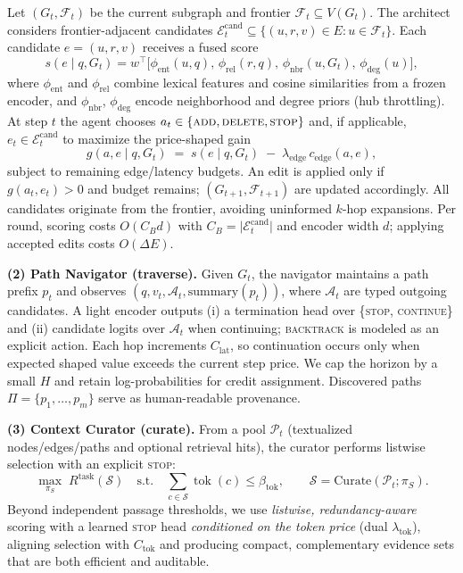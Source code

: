 \documentclass{article} %
\begin{document}
Let \((G_t,\mathcal{F}_t)\) be the current subgraph and frontier \(\mathcal{F}_t \subseteq V(G_t)\).
The architect considers frontier-adjacent candidates
$
\mathcal{E}^{\text{cand}}_t \subseteq \{(u,r,v)\in E : u\in \mathcal{F}_t\}.
$
Each candidate \(e=(u,r,v)\) receives a fused score
\[
s(e \mid q,G_t)=
w^\top\!\Big[
\phi_{\text{ent}}(u,q),\,
\phi_{\text{rel}}(r,q),\,
\phi_{\text{nbr}}(u,G_t),\,
\phi_{\text{deg}}(u)
\Big],
\]
where \(\phi_{\text{ent}}\) and \(\phi_{\text{rel}}\) combine lexical features and cosine similarities from a frozen encoder, and
\(\phi_{\text{nbr}}\), \(\phi_{\text{deg}}\) encode neighborhood and degree priors (hub throttling).
At step \(t\) the agent chooses \(a_t \in \{\textsc{add},\textsc{delete},\textsc{stop}\}\) and, if applicable, \(e_t \in \mathcal{E}^{\text{cand}}_t\) to maximize the price-shaped gain
\[
g(a,e \mid q,G_t) \;=\; s(e \mid q,G_t)\;-\;\lambda_{\text{edge}}\,c_{\text{edge}}(a,e),
\]
subject to remaining edge/latency budgets.
An edit is applied only if \(g(a_t,e_t)>0\) and budget remains; \((G_{t+1},\mathcal{F}_{t+1})\) are updated accordingly.
All candidates originate from the frontier, avoiding uninformed \(k\)-hop expansions.
Per round, scoring costs \(O(C_B d)\) with \(C_B=\lvert \mathcal{E}^{\text{cand}}_t\rvert\) and encoder width \(d\); applying accepted edits costs \(O(\Delta E)\).



\textbf{(2) Path Navigator (traverse).}
Given $G_t$, the navigator maintains a path prefix $p_t$ and observes $(q, v_t, \mathcal{A}_t, \mathrm{summary}(p_t))$, where $\mathcal{A}_t$ are typed outgoing candidates. A light encoder outputs (i) a termination head over \{\textsc{stop}, \textsc{continue}\} and (ii) candidate logits over $\mathcal{A}_t$ when continuing; \textsc{backtrack} is modeled as an explicit action. Each hop increments $C_{\mathrm{lat}}$, so continuation occurs only when expected shaped value exceeds the current step price. We cap the horizon by a small $H$ and retain log-probabilities for credit assignment. Discovered paths $\Pi=\{p_1,\dots,p_m\}$ serve as human-readable provenance.



\textbf{(3) Context Curator (curate).}
From a pool $\mathcal{P}_t$ (textualized nodes/edges/paths and optional retrieval hits), the curator performs listwise selection with an explicit \textsc{stop}:
\[
\max_{\pi_S}\; R^{\text{task}}(\mathcal{S})
\quad \text{s.t.} \quad
\sum_{c\in\mathcal{S}}\operatorname{tok}(c)\le \beta_{\text{tok}},
\qquad
\mathcal{S}=\text{Curate}(\mathcal{P}_t;\pi_S).
\]
Beyond independent passage thresholds, we use \emph{listwise, redundancy-aware} scoring with a learned \textsc{stop} head \emph{conditioned on the token price} (dual $\lambda_{\mathrm{tok}}$), aligning selection with $C_{\mathrm{tok}}$ and producing compact, complementary evidence sets that are both efficient and auditable.
\end{document}
